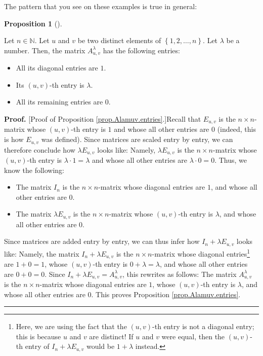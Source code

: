 \documentclass[numbers=enddot,12pt,final,onecolumn,notitlepage]{scrartcl}%
\theoremstyle{definition}
\newtheorem{prop}[theo]{Proposition}
\newenvironment{proposition}[1][]
{\begin{prop}[#1]\begin{leftbar}}
{\end{leftbar}\end{prop}}
\newenvironment{proof}[1][Proof]{\noindent\textbf{#1.} }{\ \rule{0.5em}{0.5em}}
\begin{document}
The pattern that you see on these examples is true in general:

\begin{proposition}
\label{prop.Alamuv.entries}Let $n\in\mathbb{N}$. Let $u$ and $v$ be two
distinct elements of $\left\{  1,2,\ldots,n\right\}  $. Let $\lambda$ be a
number. Then, the matrix $A_{u,v}^{\lambda}$ has the following entries:

\begin{itemize}
\item All its diagonal entries are $1$.

\item Its $\left(  u,v\right)  $-th entry is $\lambda$.

\item All its remaining entries are $0$.
\end{itemize}
\end{proposition}

\begin{proof}
[Proof of Proposition \ref{prop.Alamuv.entries}.]Recall that $E_{u,v}$ is the
$n\times n$-matrix whose $\left(  u,v\right)  $-th entry is $1$ and whose all
other entries are $0$ (indeed, this is how $E_{u,v}$ was defined). Since
matrices are scaled entry by entry, we can therefore conclude how $\lambda
E_{u,v}$ looks like: Namely, $\lambda E_{u,v}$ is the $n\times n$-matrix whose
$\left(  u,v\right)  $-th entry is $\lambda\cdot1=\lambda$ and whose all other
entries are $\lambda\cdot0=0$. Thus, we know the following:

\begin{itemize}
\item The matrix $I_{n}$ is the $n\times n$-matrix whose diagonal entries are
$1$, and whose all other entries are $0$.

\item The matrix $\lambda E_{u,v}$ is the $n\times n$-matrix whose $\left(
u,v\right)  $-th entry is $\lambda$, and whose all other entries are $0$.
\end{itemize}

Since matrices are added entry by entry, we can thus infer how $I_{n}+\lambda
E_{u,v}$ looks like: Namely, the matrix $I_{n}+\lambda E_{u,v}$ is the
$n\times n$-matrix whose diagonal entries\footnote{Here, we are using the fact
that the $\left(  u,v\right)  $-th entry is not a diagonal entry; this is
because $u$ and $v$ are distinct! If $u$ and $v$ were equal, then the $\left(
u,v\right)  $-th entry of $I_{n}+\lambda E_{u,v}$ would be $1+\lambda$
instead.} are $1+0=1$, whose $\left(  u,v\right)  $-th entry is $0+\lambda
=\lambda$, and whose all other entries are $0+0=0$. Since $I_{n}+\lambda
E_{u,v}=A_{u,v}^{\lambda}$, this rewrites as follows: The matrix
$A_{u,v}^{\lambda}$ is the $n\times n$-matrix whose diagonal entries are $1$,
whose $\left(  u,v\right)  $-th entry is $\lambda$, and whose all other
entries are $0$. This proves Proposition \ref{prop.Alamuv.entries}.
\end{proof}
\end{document}
